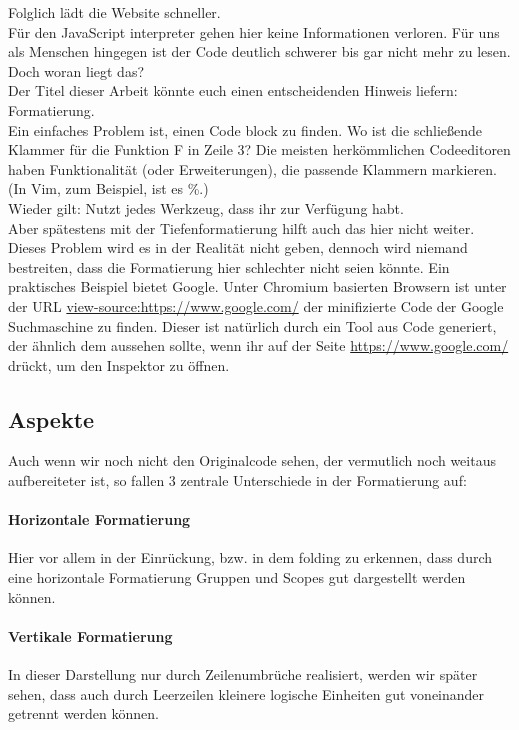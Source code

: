 		Folglich lädt die Website schneller.\\
		Für den JavaScript interpreter gehen hier keine Informationen verloren.
		Für uns als Menschen hingegen ist der Code deutlich schwerer bis gar nicht mehr zu lesen.\\
		Doch woran liegt das?\\
		Der Titel dieser Arbeit könnte euch einen entscheidenden Hinweis liefern: Formatierung.\\
		Ein einfaches Problem ist, einen Code block zu finden.
		Wo ist die schließende Klammer für die Funktion F in Zeile 3?
		Die meisten herkömmlichen Codeeditoren haben Funktionalität (oder Erweiterungen), die passende Klammern markieren. (In Vim, zum Beispiel, ist es \%.)\\
		Wieder gilt: Nutzt jedes Werkzeug, dass ihr zur Verfügung habt.\\
		Aber spätestens mit der Tiefenformatierung hilft auch das hier nicht weiter.\\
		Dieses Problem wird es in der Realität nicht geben, dennoch wird niemand bestreiten, dass die Formatierung hier schlechter nicht seien könnte.
		Ein praktisches Beispiel bietet Google. Unter Chromium basierten Browsern ist unter der URL \href{view-source:https://www.google.com/}{view-source:https://www.google.com/} der minifizierte Code der Google Suchmaschine zu finden.
		Dieser ist natürlich durch ein Tool aus  Code generiert, der ähnlich dem aussehen sollte, wenn ihr auf der Seite \href{https://www.google.com/}{https://www.google.com/}  drückt, um den Inspektor zu öffnen.

	\subsection{Aspekte}
		Auch wenn wir noch nicht den Originalcode sehen, der vermutlich noch weitaus aufbereiteter ist, so fallen 3 zentrale Unterschiede in der Formatierung auf:
		\paragraph{Horizontale Formatierung}
			Hier vor allem in der Einrückung, bzw. in dem folding zu erkennen, dass durch eine horizontale Formatierung Gruppen und Scopes gut dargestellt werden können.
		\paragraph{Vertikale Formatierung}
			In dieser Darstellung nur durch Zeilenumbrüche realisiert, werden wir später sehen, dass auch durch Leerzeilen kleinere logische Einheiten gut voneinander getrennt werden können.
